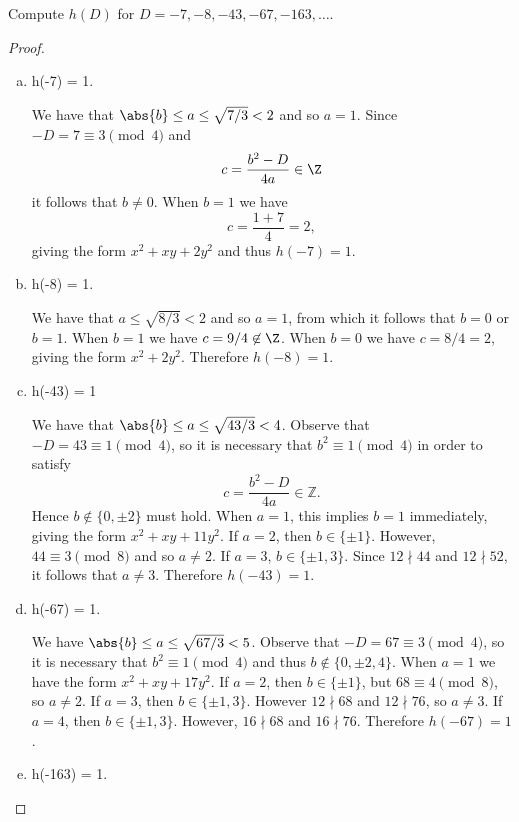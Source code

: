 \documentclass[10pt]{amsart}
\begin{document}
\setcounter{thm}{5}
\begin{thm}
  Compute $h(D)$ for $D = -7, -8, -43, -67, -163, \ldots$.
  \begin{proof}
    \begin{enumerate}[(a)]
    \item
      h(-7) = 1.
      
      We have that $\abs{b} \leq a \leq \sqrt{7/3} < 2$ and so $a = 1$.
      Since $-D = 7 \equiv 3 \pmod{4}$ and $$c = \frac{b^2 - D}{4a} \in \Z$$ it follows that $b \neq 0$.
      When $b = 1$ we have
      $$c = \frac{1 + 7}{4} = 2,$$ 
      giving the form $x^2 + xy + 2y^2$ and thus $h(-7) = 1$.
    \item
      h(-8) = 1.
      
      We have that $a \leq \sqrt{8/3} < 2$ and so $a = 1$, from which it follows that $b = 0$ or $b = 1$.
      When $b = 1$ we have $c = 9/4 \not \in \Z$.
      When $b = 0$ we have $c = 8/4 = 2$, giving the form $x^2 + 2y^2$.
      Therefore $h(-8) = 1$.
    \item
      h(-43) = 1

      We have that $\abs{b} \leq a \leq \sqrt{43/3} < 4$.
      Observe that $-D = 43 \equiv 1 \pmod{4}$, so it is necessary that $b^2 \equiv 1 \pmod 4$ in order to satisfy
      $$c = \frac{b^2 - D}{4a} \in \mathbb{Z}.$$
      Hence $b \not \in \{0, \pm 2\}$ must hold.
      When $a = 1$, this implies $b = 1$ immediately, giving the form $x^2 + xy + 11y^2$.
      If $a = 2$, then $b \in \{\pm 1\}$.
      However, $44 \equiv 3 \pmod{8}$ and so $a \neq 2$.
      If $a = 3$, $b \in \{\pm 1, 3\}$.
      Since $12 \nmid 44$ and $12 \nmid 52$, it follows that $a \neq 3$.
      Therefore $h(-43) = 1$.
    \item
      h(-67) = 1.
      
      We have $\abs{b} \leq a \leq \sqrt{67/3} < 5$.
      Observe that $-D = 67 \equiv 3 \pmod{4}$, so it is necessary that $b^2 \equiv 1 \pmod{4}$ and thus $b \not \in \{0, \pm 2, 4\}$.
      When $a = 1$ we have the form $x^2 + xy + 17y^2$.
      If $a = 2$, then $b \in \{\pm 1\}$, but $68 \equiv 4 \pmod{8}$, so $a \neq 2$. 
      If $a = 3$, then $b \in \{\pm 1, 3\}$.
      However $12 \nmid 68$ and $12 \nmid 76$, so $a \neq 3$.
      If $a = 4$, then $b \in \{\pm 1, 3\}$.
      However, $16 \nmid 68$ and $16 \nmid 76$.
      Therefore $h(-67) = 1$.
    \item
      h(-163) = 1.
      

\end{enumerate}
\end{proof}
\end{thm}
\end{document}
